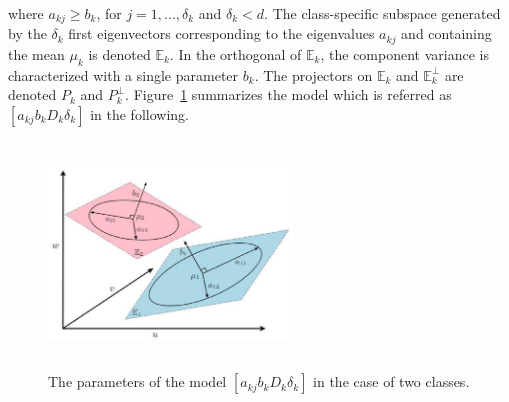 \documentclass[12pt]{article}
\begin{document}
where $a_{kj} \geq b_{k}$, for $j=1,...,\delta_{k}$ and $\delta_{k}<d$. The class-specific
subspace generated by the $\delta_{k}$ first eigenvectors corresponding to the eigenvalues
$a_{kj}$ and containing the mean $\mu_{k}$ is denoted $\mathbb{E}_{k}$.  In the orthogonal of
$\mathbb{E}_{k}$, the component variance is characterized with a single parameter $b_{k}$.  The
projectors on $\mathbb{E}_{k}$ and $\mathbb{E}_{k}^{\perp}$ are denoted $P_k$ and
$P_k^{\perp}$.
Figure~\ref{cap:Illustration_model2} summarizes the model which is referred as
$[a_{kj}b_{k}D_{k}\delta_{k}]$ in the following.




\begin{figure}[!ht]
  \centering
  \includegraphics[width=6.5cm, height=6cm]{Diagramme_1.eps}
  \caption{\label{cap:Illustration_model2}The parameters of the model $[a_{kj}b_{k}D_{k}\delta_{k}]$ in the case of two classes.}
 \end{figure}
\end{document}
